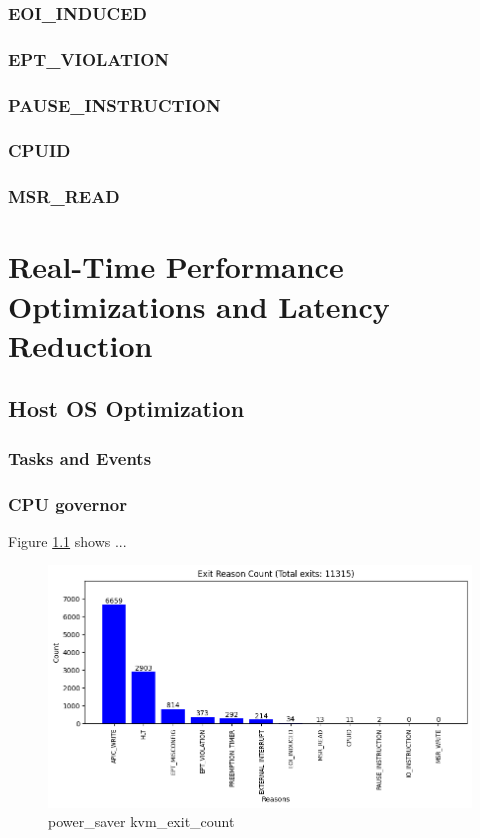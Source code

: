 \documentclass[MMR,Master,english]{twbook}
\begin{document}
\clearpage
\subsection{EOI\_INDUCED}

\clearpage
\subsection{EPT\_VIOLATION}

\clearpage
\subsection{PAUSE\_INSTRUCTION}

\clearpage
\subsection{CPUID}

\clearpage
\subsection{MSR\_READ}

\clearpage

\chapter{Real-Time Performance Optimizations and Latency Reduction}\label{cha:latency_reduction}
\section{Host OS Optimization}

\subsection{Tasks and Events}
\clearpage
\subsection{CPU governor}

Figure \ref{fig:power_saver_kvm_exit} shows ...

\begin{figure}[H]
	\centering
	\includegraphics[width=1.0\columnwidth]{img/power_saver/kvm_exit_count.png}
	\caption[power\_saver kvm\_exit\_count]{power\_saver kvm\_exit\_count}
	\label{fig:power_saver_kvm_exit}
\end{figure}
\clearpage
\end{document}
